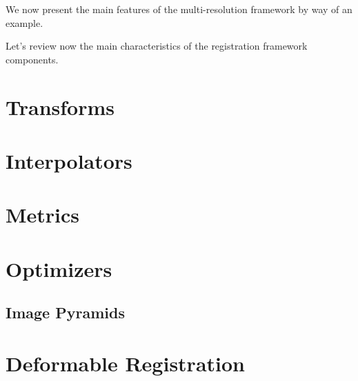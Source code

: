 We now present the main features of the multi-resolution framework by
way of an example.



Let's review now the main characteristics of the registration framework components. 

\section{Transforms}
\label{sec:Transforms}


\section{Interpolators}
\label{sec:Interpolators}


\section{Metrics}
\label{sec:Metrics}


\section{Optimizers}
\label{sec:Optimizers}


\subsection{Image Pyramids}
\label{sec:ImagePyramids}


\section{Deformable Registration}
\label{sec:DeformableRegistration}



